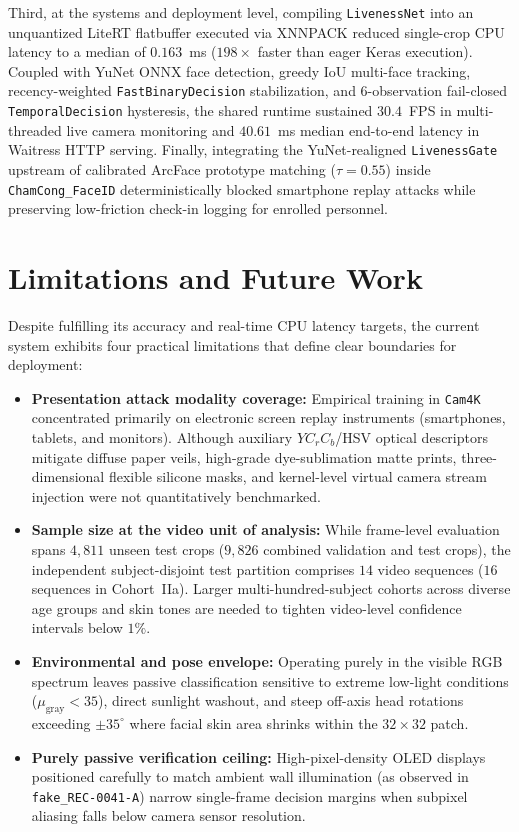Third, at the systems and deployment level, compiling \texttt{LivenessNet} into an unquantized LiteRT flatbuffer executed via XNNPACK reduced single-crop CPU latency to a median of $0.163$~ms ($198\times$ faster than eager Keras execution). Coupled with YuNet ONNX face detection, greedy $\text{IoU}$ multi-face tracking, recency-weighted \texttt{FastBinaryDecision} stabilization, and $6$-observation fail-closed \texttt{TemporalDecision} hysteresis, the shared runtime sustained $30.4$~FPS in multi-threaded live camera monitoring and $40.61$~ms median end-to-end latency in Waitress HTTP serving. Finally, integrating the YuNet-realigned \texttt{LivenessGate} upstream of calibrated ArcFace prototype matching ($\tau = 0.55$) inside \texttt{ChamCong\_FaceID} deterministically blocked smartphone replay attacks while preserving low-friction check-in logging for enrolled personnel.

\section{Limitations and Future Work}
\label{sec:limitations_future_work}

Despite fulfilling its accuracy and real-time CPU latency targets, the current system exhibits four practical limitations that define clear boundaries for deployment:
\begin{itemize}
    \item \textbf{Presentation attack modality coverage:} Empirical training in \texttt{Cam4K} concentrated primarily on electronic screen replay instruments (smartphones, tablets, and monitors). Although auxiliary $YC_rC_b$/HSV optical descriptors mitigate diffuse paper veils, high-grade dye-sublimation matte prints, three-dimensional flexible silicone masks, and kernel-level virtual camera stream injection were not quantitatively benchmarked.
    \item \textbf{Sample size at the video unit of analysis:} While frame-level evaluation spans $4{,}811$ unseen test crops ($9{,}826$ combined validation and test crops), the independent subject-disjoint test partition comprises $14$ video sequences ($16$ sequences in Cohort~IIa). Larger multi-hundred-subject cohorts across diverse age groups and skin tones are needed to tighten video-level confidence intervals below $1\%$.
    \item \textbf{Environmental and pose envelope:} Operating purely in the visible RGB spectrum leaves passive classification sensitive to extreme low-light conditions ($\mu_{\text{gray}} < 35$), direct sunlight washout, and steep off-axis head rotations exceeding $\pm 35^\circ$ where facial skin area shrinks within the $32\times32$ patch.
    \item \textbf{Purely passive verification ceiling:} High-pixel-density OLED displays positioned carefully to match ambient wall illumination (as observed in \texttt{fake\_REC-0041-A}) narrow single-frame decision margins when subpixel aliasing falls below camera sensor resolution.
\end{itemize}

